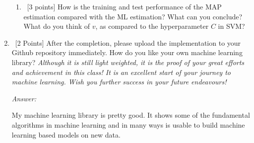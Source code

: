 \documentclass[12pt, fullpage,letterpaper]{article}
\begin{document}
\begin{enumerate}
\begin{enumerate}
	\item~[3 points] How is the training and test performance of the MAP estimation compared with the ML estimation? What can you conclude? What do you think of $v$, as compared to  the hyperparameter $C$ in SVM?
\end{enumerate}

	\item~[2 Points]  After the completion, please upload the implementation to your Github repository immediately.  How do you like your own machine learning library? \textit{Although it is still light weighted, it is the proof of  your great efforts and achievement  in this class! It is an excellent start of your journey to machine learning.  Wish you further success in your future endeavours!}

	\textit{Answer:}

	My machine learning library is pretty good.
	It shows some of the fundamental algorithms in machine learning and in many ways is usable to build machine learning based models on new data.

	
\end{enumerate}
\end{document}
